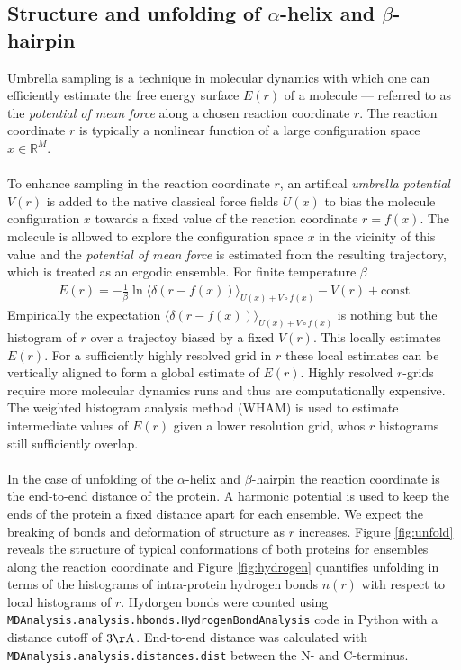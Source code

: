\documentclass{article}[12pt]
\numberwithin{equation}{section}
\def\code#1{\texttt{#1}}
\begin{document}
\subsection{Structure and unfolding of $\alpha$-helix and $\beta$-hairpin}
Umbrella sampling is a technique in molecular dynamics with which one can
efficiently estimate the free energy surface $E(r)$ of a molecule --- referred to as the
\textit{potential of mean force} along a chosen reaction coordinate $r$. The
reaction coordinate $r$ is typically a nonlinear function of a large configuration
space $x\in\mathbb{R}^M$.
\\\\
To enhance sampling in the reaction coordinate $r$, an artifical \textit{umbrella
potential} $V(r)$ is added to the native classical force fields $U(x)$ to bias the molecule
configuration $x$ towards a fixed value of the reaction coordinate $r=f(x)$.
The molecule is allowed to explore the configuration space $x$ in the vicinity of
this value and the \textit{potential of mean force} is estimated from the resulting
trajectory, which is treated as an ergodic ensemble. For finite temperature $\beta$
\begin{align}
	E(r)= -\frac{1}{\beta}\ln\big\langle
	\delta\left(r-f(x)\right)
	\big\rangle_{U(x)+V\circ f(x)}
		-V(r)
		+\mathrm{const}
\end{align}
Empirically the expectation $\langle\delta\left(r-f(x)\right)\rangle_{U(x)+V\circ f(x)}$
is nothing but the histogram of $r$ over a trajectoy biased by a fixed $V(r)$. This
locally estimates $E(r)$. For a sufficiently highly resolved grid in $r$ these
local estimates can be vertically aligned to form a global estimate of $E(r)$.
Highly resolved $r$-grids require more molecular dynamics runs and thus
are computationally expensive. The weighted histogram analysis method (WHAM)
is used to estimate intermediate values of $E(r)$ given a lower resolution grid,
whos $r$ histograms still sufficiently overlap.
\\\\
In the case of unfolding of the $\alpha$-helix and $\beta$-hairpin
the reaction coordinate is the end-to-end distance of the protein. A harmonic
potential is used to keep the ends of the protein a fixed distance apart for
each ensemble. We expect the breaking of bonds and deformation of structure
as $r$ increases.
Figure \ref{fig:unfold} reveals the structure of typical conformations of both
proteins for ensembles along the reaction coordinate and Figure \ref{fig:hydrogen}
quantifies unfolding in terms of the histograms of intra-protein hydrogen bonds
$n(r)$ with respect to local histograms of $r$. Hydorgen bonds were counted
using \code{MDAnalysis.analysis.hbonds.HydrogenBondAnalysis} code in Python with
a distance cutoff of $3\mathrm{\AA}$. End-to-end distance was calculated with
\code{MDAnalysis.analysis.distances.dist} between the N- and C-terminus.
\end{document}

